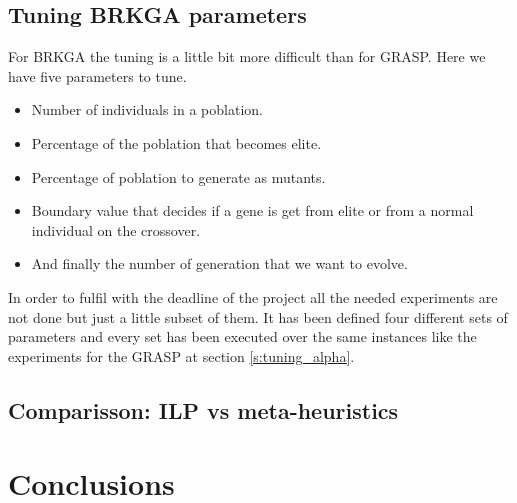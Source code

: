\documentclass[]{report}
\begin{document}
\section{Tuning BRKGA parameters}\label{s:tuning_brkga_params}

For BRKGA the tuning is a little bit more difficult than for GRASP. Here we have five parameters to tune.
\begin{itemize}
	\item Number of individuals in a poblation.
	\item Percentage of the poblation that becomes elite.
	\item Percentage of poblation to generate as mutants.
	\item Boundary value that decides if a gene is get from elite or from a normal individual on the crossover.
	\item And finally the number of generation that we want to evolve.
\end{itemize}

In order to fulfil with the deadline of the project all the needed experiments are not done but just a little subset of them. It has been defined four different sets of parameters and every set has been executed over the same instances like the experiments for the GRASP at section \ref{s:tuning_alpha}.

\section{Comparisson: ILP vs meta-heuristics}\label{s:comparisson}


\chapter{Conclusions}\label{ch:conclusions}
\end{document}
